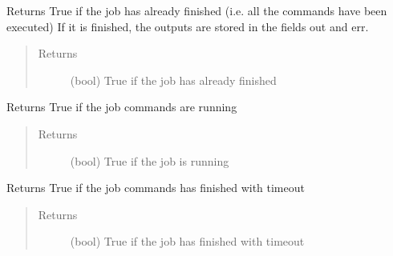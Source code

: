 \documentclass[a4paper,10pt,english]{sphinxmanual}
\begin{document}
\begin{fulllineitems}
\begin{fulllineitems}
\begin{quote}
\begin{description}
\end{description}\end{quote}

\end{fulllineitems}


\begin{fulllineitems}
\label{\detokenize{apidoc_commands/commands:commands.jobs.Job.has_finished}}
Returns True if the job has already finished 
(i.e. all the commands have been executed)
If it is finished, the outputs are stored in the fields out and err.
\begin{quote}\begin{description}
\item[{Returns}] \leavevmode
(bool) True if the job has already finished

\end{description}\end{quote}

\end{fulllineitems}


\begin{fulllineitems}
\label{\detokenize{apidoc_commands/commands:commands.jobs.Job.is_running}}
Returns True if the job commands are running
\begin{quote}\begin{description}
\item[{Returns}] \leavevmode
(bool) True if the job is running

\end{description}\end{quote}

\end{fulllineitems}


\begin{fulllineitems}
\label{\detokenize{apidoc_commands/commands:commands.jobs.Job.is_timeout}}
Returns True if the job commands has finished with timeout
\begin{quote}\begin{description}
\item[{Returns}] \leavevmode
(bool) True if the job has finished with timeout


\end{description}
\end{quote}
\end{fulllineitems}
\end{fulllineitems}
\end{document}
